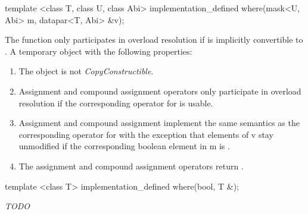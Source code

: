 \begin{itemdecl}
template <class T, class U, class Abi> implementation_defined where(mask<U, Abi> m, datapar<T, Abi> &v);
\end{itemdecl}
\begin{itemdescr}
  \pnum\remarks The function only participates in overload resolution if \mask[<U, Abi>] is implicitly convertible to \mask[<T, Abi>].
  \pnum\returns A temporary object with the following properties:
  \begin{enumerate}
    \item The object is not \textit{CopyConstructible}.
    \item Assignment and compound assignment operators only participate in overload resolution if the corresponding operator for \datapar[<T, Abi>] is usable.
    \item \effects Assignment and compound assignment implement the same semantics as the corresponding operator for \datapar[<T, Abi>] with the exception that elements of \code v stay unmodified if the corresponding boolean element in \code m is \false.
    \item The assignment and compound assignment operators return \void.
  \end{enumerate}
\end{itemdescr}

\begin{itemdecl}
template <class T> implementation_defined where(bool, T &);
\end{itemdecl}
\begin{itemdescr}
  \textit{TODO}
\end{itemdescr}

\begin{itemdecl}
\end{itemdecl}
\begin{itemdescr}
\end{itemdescr}

\begin{itemdecl}
\end{itemdecl}
\begin{itemdescr}
\end{itemdescr}

\begin{itemdecl}
\end{itemdecl}
\begin{itemdescr}
\end{itemdescr}

\begin{itemdecl}
\end{itemdecl}
\begin{itemdescr}
\end{itemdescr}
